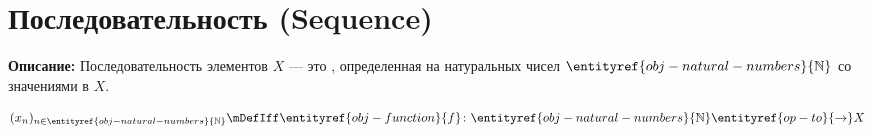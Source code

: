 
\section{Последовательность (Sequence)}
\label{entity:obj-sequence}

\textbf{Описание:}
Последовательность элементов  $X$ — это , определенная на  натуральных чисел $\entityref{obj-natural-numbers}{\mathbb{N}}$ со значениями в $X$.

\hypertarget{obj-sequence}{}
\hypertarget{obj-sequence}{}
\begin{object}
 

\[
(x_n)_{n \in \entityref{obj-natural-numbers}{\mathbb{N}}} \mDefIff \entityref{obj-function}{f} \colon \entityref{obj-natural-numbers}{\mathbb{N}} \entityref{op-to}{\to} X
\]
\end{object}